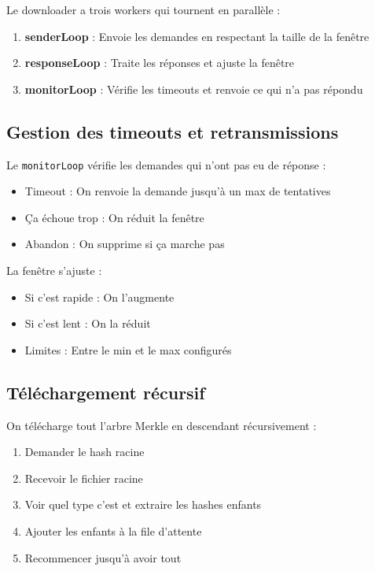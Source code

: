 \documentclass[11pt,a4paper]{report}
\begin{document}
Le downloader a trois workers qui tournent en parallèle :

\begin{enumerate}
    \item \textbf{senderLoop} : Envoie les demandes en respectant la taille de la fenêtre
    \item \textbf{responseLoop} : Traite les réponses et ajuste la fenêtre
    \item \textbf{monitorLoop} : Vérifie les timeouts et renvoie ce qui n'a pas répondu
\end{enumerate}

\subsection{Gestion des timeouts et retransmissions}

Le \texttt{monitorLoop} vérifie les demandes qui n'ont pas eu de réponse :

\begin{itemize}
    \item Timeout : On renvoie la demande jusqu'à un max de tentatives
    \item Ça échoue trop : On réduit la fenêtre
    \item Abandon : On supprime si ça marche pas
\end{itemize}

La fenêtre s'ajuste :
\begin{itemize}
    \item Si c'est rapide : On l'augmente
    \item Si c'est lent : On la réduit
    \item Limites : Entre le min et le max configurés
\end{itemize}

\subsection{Téléchargement récursif}

On télécharge tout l'arbre Merkle en descendant récursivement :

\begin{enumerate}
    \item Demander le hash racine
    \item Recevoir le fichier racine
    \item Voir quel type c'est et extraire les hashes enfants
    \item Ajouter les enfants à la file d'attente
    \item Recommencer jusqu'à avoir tout
\end{enumerate}
\end{document}
